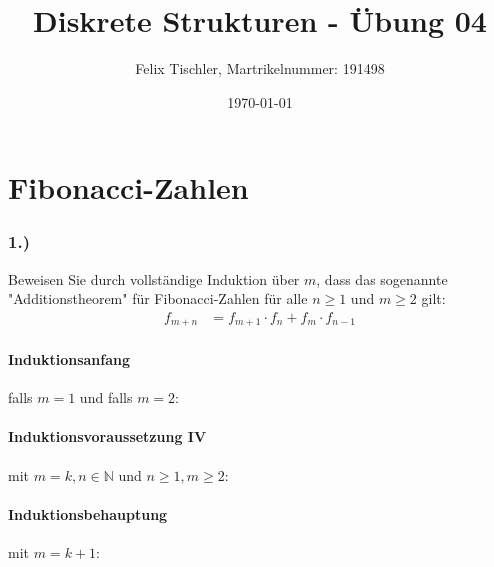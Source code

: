 \documentclass[titlepage]{article}
\begin{document}
	
	\title{Diskrete Strukturen - Übung 04}
	\author{Felix Tischler, Martrikelnummer: 191498}
	\date{\today}
	\maketitle
	
	\part*{Fibonacci-Zahlen}
	\section*{1.)}Beweisen Sie durch vollständige Induktion über $m$, dass das sogenannte "Additionstheorem" für Fibonacci-Zahlen für alle $n\ge1$ und $m\ge2$ gilt:
		\begin{align*}
			f_{m+n}&=f_{m+1}\cdot f_n+f_m\cdot f_{n-1}
		\end{align*}
		\subsection*{Induktionsanfang} falls $m=1$ und falls $m=2$:\\
		\subsection*{Induktionsvoraussetzung IV}
		mit $m=k, n\in\mathbb{N}$ und $n\ge1,m\ge2$:\\
		\subsection*{Induktionsbehauptung}
		mit $m=k+1$:\\
\end{document}
